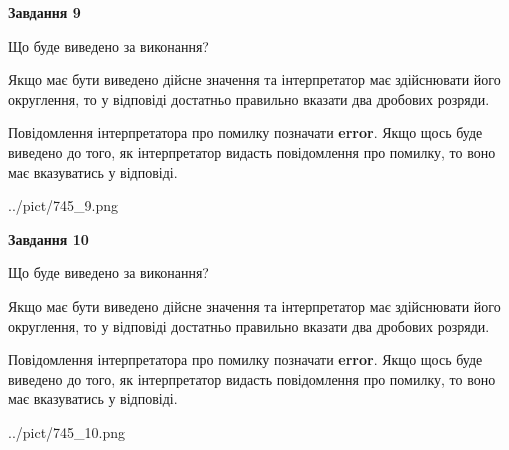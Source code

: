 \documentclass[12pt, ukrainian]{article}
\begin{document}
{\begin {Large}
{\begin {center}\textbf{Завдання 9}\end {center}}\par
Що буде виведено за виконання? \par

Якщо має бути виведено дійсне значення та інтерпретатор має здійснювати його округлення, 
то у відповіді достатньо правильно вказати два дробових розряди.

Повідомлення інтерпретатора про помилку позначати \textbf{error}.
Якщо щось буде виведено до того, як інтерпретатор видасть повідомлення про помилку, 
то воно має вказуватись у відповіді. \par

\begin{center}
	{../pict/745_9.png}
\end{center}
\newpage

{\begin {center}\textbf{Завдання 10}\end {center}}\par
Що буде виведено за виконання? \par

Якщо має бути виведено дійсне значення та інтерпретатор має здійснювати його округлення, 
то у відповіді достатньо правильно вказати два дробових розряди.

Повідомлення інтерпретатора про помилку позначати \textbf{error}.
Якщо щось буде виведено до того, як інтерпретатор видасть повідомлення про помилку, 
то воно має вказуватись у відповіді. \par

\begin{center}
	{../pict/745_10.png}
\end{center}
\newpage

\end {Large}}
\end{document}
